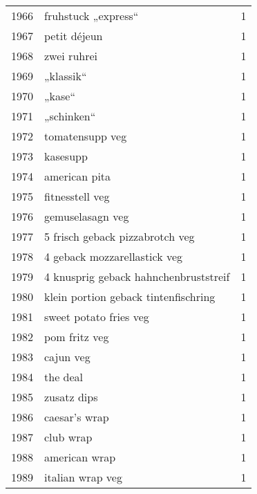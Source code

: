 \begin{tabular}{llr}
1966 &                                fruhstuck „express“ &      1 \\
1967 &                                       petit déjeun &      1 \\
1968 &                                        zwei ruhrei &      1 \\
1969 &                                          „klassik“ &      1 \\
1970 &                                             „kase“ &      1 \\
1971 &                                         „schinken“ &      1 \\
1972 &                                    tomatensupp veg &      1 \\
1973 &                                           kasesupp &      1 \\
1974 &                                      american pita &      1 \\
1975 &                                    fitnesstell veg &      1 \\
1976 &                                   gemuselasagn veg &      1 \\
1977 &                    5 frisch geback pizzabrotch veg &      1 \\
1978 &                       4 geback mozzarellastick veg &      1 \\
1979 &              4 knusprig geback hahnchenbruststreif &      1 \\
1980 &               klein portion geback tintenfischring &      1 \\
1981 &                             sweet potato fries veg &      1 \\
1982 &                                      pom fritz veg &      1 \\
1983 &                                          cajun veg &      1 \\
1984 &                                           the deal &      1 \\
1985 &                                        zusatz dips &      1 \\
1986 &                                      caesar’s wrap &      1 \\
1987 &                                          club wrap &      1 \\
1988 &                                      american wrap &      1 \\
1989 &                                   italian wrap veg &      1 \\

\end{tabular}
